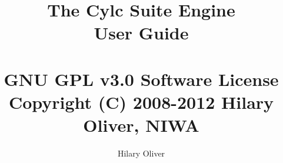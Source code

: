 \documentclass[titlepage]{article}
\begin{document}
\title{The Cylc Suite Engine\\
User Guide \\
\protect  \\
GNU GPL v3.0 Software License \\
Copyright (C) 2008-2012 Hilary Oliver, NIWA}

\author{Hilary Oliver}


\maketitle

%

\tableofcontents



\end{document}
